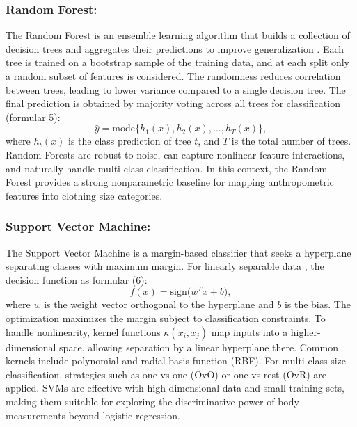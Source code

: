 \documentclass{llncs}
\begin{document}
\subsubsection{Random Forest:}
The Random Forest is an ensemble learning algorithm that builds a collection of decision trees and aggregates their predictions to improve generalization \cite{ref18}. 
Each tree is trained on a bootstrap sample of the training data, and at each split only a random subset of features is considered. 
The randomness reduces correlation between trees, leading to lower variance compared to a single decision tree. 
The final prediction is obtained by majority voting across all trees for classification (formular 5):
\begin{equation}
\hat{y} = \mathrm{mode}\{h_{1}(x), h_{2}(x), \ldots, h_{T}(x)\},
\end{equation}
where $h_{t}(x)$ is the class prediction of tree $t$, and $T$ is the total number of trees. 
Random Forests are robust to noise, can capture nonlinear feature interactions, and naturally handle multi-class classification. 
In this context, the Random Forest provides a strong nonparametric baseline for mapping anthropometric features into clothing size categories.

\subsubsection{Support Vector Machine:} The Support Vector Machine is a margin-based classifier that seeks a hyperplane separating classes with maximum margin. 
For linearly separable data \cite{ref19}, the decision function as formular (6):
\begin{equation}
f(x) = \mathrm{sign}\big(w^{T}x + b\big),
\end{equation}
where $w$ is the weight vector orthogonal to the hyperplane and $b$ is the bias. The optimization maximizes the margin subject to classification constraints. To handle nonlinearity, kernel functions $\kappa(x_{i},x_{j})$ map inputs into a higher-dimensional space, 
allowing separation by a linear hyperplane there. 
Common kernels include polynomial and radial basis function (RBF). For multi-class size classification, strategies such as one-vs-one (OvO) or one-vs-rest (OvR) are applied. SVMs are effective with high-dimensional data and small training sets, making them suitable for exploring the discriminative power of body measurements beyond logistic regression.
\end{document}
